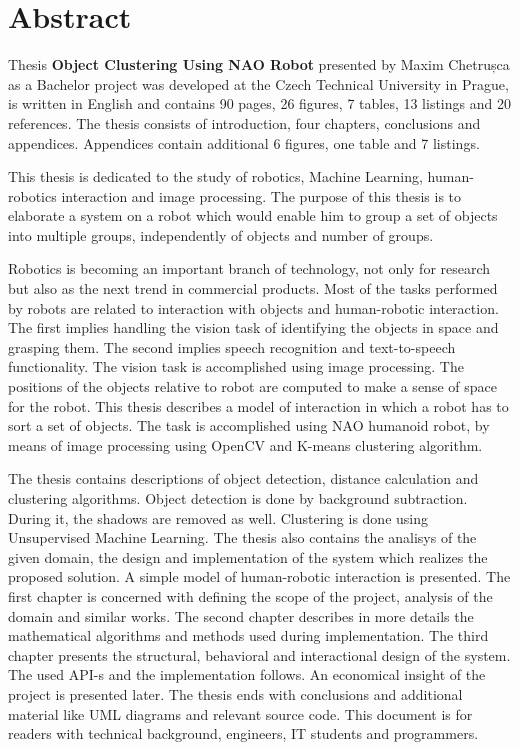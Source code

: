 \section*{Abstract}

Thesis \textbf{Object Clustering Using NAO Robot} presented by Maxim Chetrușca as a Bachelor project was developed at the Czech Technical University in Prague, is written in English and contains 90 pages, 26 figures, 7 tables, 13 listings and 20 references. The thesis consists of introduction, four chapters, conclusions and appendices. Appendices contain additional 6 figures, one table and 7 listings.

This thesis is dedicated to the study of robotics, Machine Learning, human-robotics interaction and image processing. The purpose of this thesis is to elaborate a system on a robot which would enable him to group a set of objects into multiple groups, independently of objects and number of groups.

Robotics is becoming an important branch of technology, not only for research but also as the next trend in commercial products. Most of the tasks performed by robots are related to interaction with objects and human-robotic interaction. The first implies handling the vision task of identifying the objects in space and grasping them. The second implies speech recognition and text-to-speech functionality. The vision task is accomplished using image processing. The positions of the objects relative to robot are computed to make a sense of space for the robot. This thesis describes a model of interaction in which a robot has to sort a set of objects. The task is accomplished using NAO humanoid robot, by means of image processing using OpenCV and K-means clustering algorithm. 

The thesis contains descriptions of object detection, distance calculation and clustering algorithms. Object detection is done by background subtraction. During it, the shadows are removed as well. Clustering is done using Unsupervised Machine Learning. The thesis also contains the analisys of the given domain, the design and implementation of the system which realizes the proposed solution. A simple model of human-robotic interaction is presented. The first chapter is concerned with defining the scope of the project, analysis of the domain and similar works. The second chapter describes in more details the mathematical algorithms and methods used during implementation. The third chapter presents the structural, behavioral and interactional design of the system. The used API-s and the implementation follows. An economical insight of the project is presented later. The thesis ends with conclusions and additional material like UML diagrams and relevant source code. This document is for readers with technical background, engineers, IT students and programmers. 